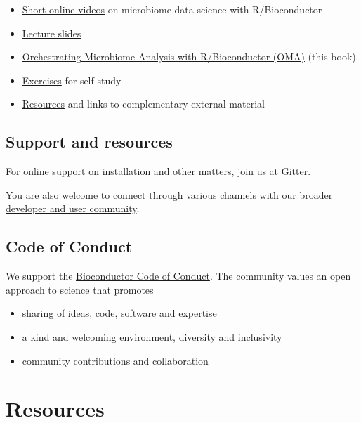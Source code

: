 \documentclass[
]{book}
\providecommand{\tightlist}{%
  \setlength{\itemsep}{0pt}\setlength{\parskip}{0pt}}
\begin{document}
\begin{itemize}
\item
  \href{https://www.youtube.com/playlist?list=PLjiXAZO27elAJEptP59BN3whVJ61XIkST}{Short online videos} on microbiome data science with R/Bioconductor
\item
  \href{https://microbiome.github.io/}{Lecture slides}
\item
  \href{https://microbiome.github.io/OMA/}{Orchestrating Microbiome Analysis with R/Bioconductor (OMA)} (this book)
\item
  \href{https://microbiome.github.io/OMA/exercises.html}{Exercises} for self-study
\item
  \href{https://microbiome.github.io/OMA/resources.html}{Resources} and links to complementary external material
\end{itemize}

\hypertarget{support-and-resources}{%
\section{Support and resources}\label{support-and-resources}}

For online support on installation and other matters, join us at
\href{https://gitter.im/microbiome/miaverse?utm_source=badge\&utm_medium=badge\&utm_campaign=pr-badge\&utm_content=badge}{Gitter}.

You are also welcome to connect through various channels with our
broader \href{https://microbiome.github.io}{developer and user community}.

\hypertarget{coc}{%
\section{Code of Conduct}\label{coc}}

We support the \href{https://bioconductor.github.io/bioc_coc_multilingual/}{Bioconductor Code of Conduct}. The community values an open approach to science that promotes

\begin{itemize}
\tightlist
\item
  sharing of ideas, code, software and expertise
\item
  a kind and welcoming environment, diversity and inclusivity
\item
  community contributions and collaboration
\end{itemize}

\hypertarget{resources}{%
\chapter{Resources}\label{resources}}
\end{document}

